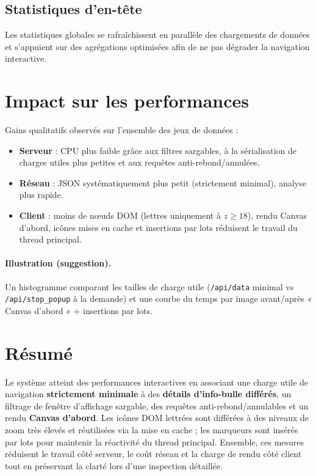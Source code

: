 \subsection{Statistiques d’en-tête}
Les statistiques globales se rafraîchissent en parallèle des chargements de données et s’appuient sur des agrégations optimisées afin de ne pas dégrader la navigation interactive.

\section{Impact sur les performances}
Gains qualitatifs observés sur l’ensemble des jeux de données :
\begin{itemize}
  \item \textbf{Serveur} : CPU plus faible grâce aux filtres sargables, à la sérialisation de charges utiles plus petites et aux requêtes anti-rebond/annulées.
  \item \textbf{Réseau} : JSON systématiquement plus petit (strictement minimal), analyse plus rapide.
  \item \textbf{Client} : moins de nœuds DOM (lettres uniquement à \(z\geq18\)), rendu Canvas d’abord, icônes mises en cache et insertions par lots réduisent le travail du thread principal.
\end{itemize}

\paragraph{Illustration (suggestion).} Un histogramme comparant les tailles de charge utile (\texttt{/api/data} minimal vs \texttt{/api/stop\_popup} à la demande) et une courbe du temps par image avant/après « Canvas d’abord » + insertions par lots.

\section{Résumé}
Le système atteint des performances interactives en associant une charge utile de navigation \textbf{strictement minimale} à des \textbf{détails d’info-bulle différés}, un filtrage de fenêtre d’affichage sargable, des requêtes anti-rebond/annulables et un rendu \textbf{Canvas d’abord}. Les icônes DOM lettrées sont différées à des niveaux de zoom très élevés et réutilisées via la mise en cache ; les marqueurs sont insérés par lots pour maintenir la réactivité du thread principal. Ensemble, ces mesures réduisent le travail côté serveur, le coût réseau et la charge de rendu côté client tout en préservant la clarté lors d’une inspection détaillée.


